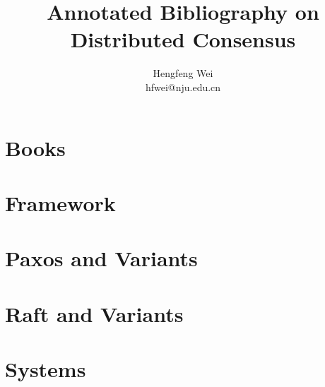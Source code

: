 \documentclass[12pt, letterpaper]{article}
\author{Hengfeng Wei \\ hfwei@nju.edu.cn}
\title{Annotated Bibliography on Distributed Consensus}
\begin{document}
\maketitle
\thispagestyle{fancy}
\section{Books} \label{section:books}

\section{Framework} \label{section:framework}

\section{Paxos and Variants} \label{section:paxos}

\section{Raft and Variants} \label{section:raft}

\section{Systems} \label{section:systems}

 
\end{document}
